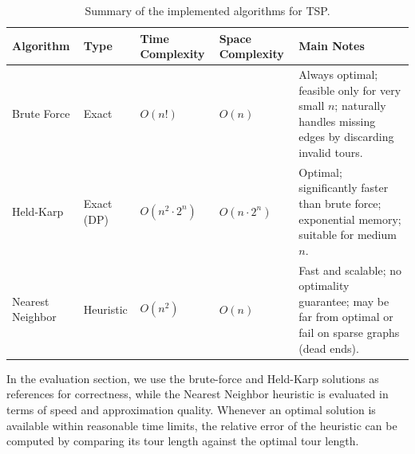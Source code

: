 \begin{table}[H]
\centering
\caption{Summary of the implemented algorithms for TSP.}
\label{tab:algorithm_comparison}
\begin{tabular}{|p{2.5cm}|p{1.5cm}|p{2cm}|p{2cm}|p{5cm}|}
\hline
\textbf{Algorithm} & \textbf{Type} & \textbf{Time Complexity} & \textbf{Space Complexity} & \textbf{Main Notes} \\
\hline
Brute Force & Exact & $O(n!)$ & $O(n)$ & Always optimal; feasible only for very small $n$; naturally handles missing edges by discarding invalid tours. \\
\hline
Held-Karp & Exact (DP) & $O(n^2 \cdot 2^n)$ & $O(n \cdot 2^n)$ & Optimal; significantly faster than brute force; exponential memory; suitable for medium $n$. \\
\hline
Nearest Neighbor & Heuristic & $O(n^2)$ & $O(n)$ & Fast and scalable; no optimality guarantee; may be far from optimal or fail on sparse graphs (dead ends). \\
\hline
\end{tabular}
\end{table}

In the evaluation section, we use the brute-force and Held-Karp solutions as references for correctness, while the Nearest Neighbor heuristic is evaluated in terms of speed and approximation quality. Whenever an optimal solution is available within reasonable time limits, the relative error of the heuristic can be computed by comparing its tour length against the optimal tour length.
